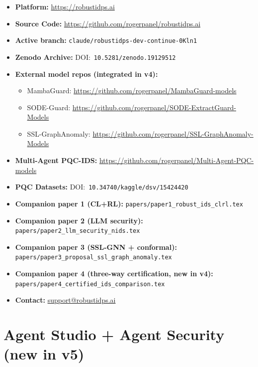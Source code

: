 \documentclass[11pt,a4paper]{article}
\begin{document}
\begin{itemize}
  \item \textbf{Platform:} \url{https://robustidps.ai}
  \item \textbf{Source Code:} \url{https://github.com/rogerpanel/robustidps.ai}
  \item \textbf{Active branch:} \texttt{claude/robustidps-dev-continue-0Kln1}
  \item \textbf{Zenodo Archive:} DOI:~\texttt{10.5281/zenodo.19129512}
  \item \textbf{External model repos (integrated in v4):}
    \begin{itemize}[nosep]
      \item MambaGuard: \url{https://github.com/rogerpanel/MambaGuard-models}
      \item SODE-Guard: \url{https://github.com/rogerpanel/SODE-ExtractGuard-Models}
      \item SSL-GraphAnomaly: \url{https://github.com/rogerpanel/SSL-GraphAnomaly-Models}
    \end{itemize}
  \item \textbf{Multi-Agent PQC-IDS:} \url{https://github.com/rogerpanel/Multi-Agent-PQC-models}
  \item \textbf{PQC Datasets:} DOI:~\texttt{10.34740/kaggle/dsv/15424420}
  \item \textbf{Companion paper 1 (CL+RL):} \texttt{papers/paper1\_robust\_ids\_clrl.tex}
  \item \textbf{Companion paper 2 (LLM security):} \texttt{papers/paper2\_llm\_security\_nids.tex}
  \item \textbf{Companion paper 3 (SSL-GNN + conformal):} \texttt{papers/paper3\_proposal\_ssl\_graph\_anomaly.tex}
  \item \textbf{Companion paper 4 (three-way certification, new in v4):} \texttt{papers/paper4\_certified\_ids\_comparison.tex}
  \item \textbf{Contact:} \href{mailto:support@robustidps.ai}{support@robustidps.ai}
\end{itemize}

\appendix

\section{Agent Studio + Agent Security (new in v5)}
\label{sec:agent_studio}
\end{document}

